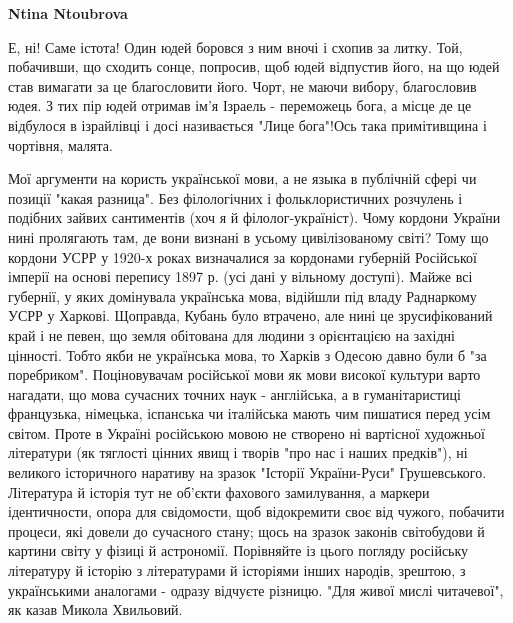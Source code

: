 \begin{itemize}
\begin{itemize}
 
\textbf{Ntina Ntoubrova} 

Е, ні! Саме істота! Один юдей боровся з ним вночі і схопив за
литку. Той, побачивши, що сходить сонце, попросив, щоб юдей відпустив його, на що
юдей став вимагати за це благословити його. Чорт, не маючи вибору, благословив
юдея. З тих пір юдей отримав ім'я Ізраель - переможець бога, а місце де це
відбулося в ізрайлівці і досі називається "Лице бога"!Ось така примітивщина і
чортівня, малята.

\end{itemize}

 

Мої аргументи на користь української мови, а не языка в публічній сфері чи
позиції "какая разница". Без філологічних і фольклористичних розчулень і
подібних зайвих сантиментів (хоч я й філолог-україніст). Чому кордони України
нині пролягають там, де вони визнані в усьому цивілізованому світі? Тому що
кордони УСРР у 1920-х роках визначалися за кордонами губерній Російської
імперії на основі перепису 1897 р. (усі дані у вільному доступі). Майже всі
губернії, у яких домінувала українська мова, відійшли під владу Раднаркому УСРР
у Харкові. Щоправда, Кубань було втрачено, але нині це зрусифікований край і не
певен, що земля обітована для людини з орієнтацією на західні цінності. Тобто
якби не українська мова, то Харків з Одесою давно були б "за поребриком".
Поціновувачам російської мови як мови високої культури варто нагадати, що мова
сучасних точних наук - англійська, а в гуманітаристиці французька, німецька,
іспанська чи італійська мають чим пишатися перед усім світом. Проте в Україні
російською мовою не створено ні вартісної художньої літератури (як тяглості
цінних явищ і творів "про нас і наших предків"), ні великого історичного
наративу на зразок "Історії України-Руси" Грушевського. Література й історія
тут не об'єкти фахового замилування, а маркери ідентичности, опора для
свідомости, щоб відокремити своє від чужого, побачити процеси, які довели до
сучасного стану; щось на зразок законів світобудови й картини світу у фізиці й
астрономії. Порівняйте із цього погляду російську літературу й історію з
літературами й історіями інших народів, зрештою, з українськими аналогами -
одразу відчуєте різницю. "Для живої мислі читачевої", як казав Микола
Хвильовий.



\end{itemize}

